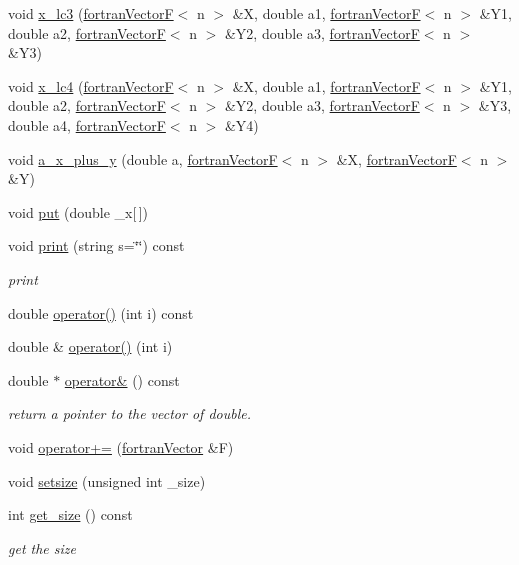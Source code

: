 \begin{DoxyCompactItemize}
\item 
void \hyperlink{classodes_1_1fortranVectorF_a643042c3db0e9be3a95a8f516d080fd4}{x\+\_\+lc3} (\hyperlink{classodes_1_1fortranVectorF}{fortran\+Vector\+F}$<$ n $>$ \&X, double a1, \hyperlink{classodes_1_1fortranVectorF}{fortran\+Vector\+F}$<$ n $>$ \&Y1, double a2, \hyperlink{classodes_1_1fortranVectorF}{fortran\+Vector\+F}$<$ n $>$ \&Y2, double a3, \hyperlink{classodes_1_1fortranVectorF}{fortran\+Vector\+F}$<$ n $>$ \&Y3)
\item 
void \hyperlink{classodes_1_1fortranVectorF_acb167044e5f56a0f7f98b6fe6746be62}{x\+\_\+lc4} (\hyperlink{classodes_1_1fortranVectorF}{fortran\+Vector\+F}$<$ n $>$ \&X, double a1, \hyperlink{classodes_1_1fortranVectorF}{fortran\+Vector\+F}$<$ n $>$ \&Y1, double a2, \hyperlink{classodes_1_1fortranVectorF}{fortran\+Vector\+F}$<$ n $>$ \&Y2, double a3, \hyperlink{classodes_1_1fortranVectorF}{fortran\+Vector\+F}$<$ n $>$ \&Y3, double a4, \hyperlink{classodes_1_1fortranVectorF}{fortran\+Vector\+F}$<$ n $>$ \&Y4)
\item 
void \hyperlink{classodes_1_1fortranVectorF_a21b1998c692b54b7dc08ad20bf34ffcd}{a\+\_\+x\+\_\+plus\+\_\+y} (double a, \hyperlink{classodes_1_1fortranVectorF}{fortran\+Vector\+F}$<$ n $>$ \&X, \hyperlink{classodes_1_1fortranVectorF}{fortran\+Vector\+F}$<$ n $>$ \&Y)
\item 
void \hyperlink{classodes_1_1fortranVectorF_aa2df927f58d5d1109a16e677ac288b66}{put} (double \+\_\+x\mbox{[}$\,$\mbox{]})
\item 
void \hyperlink{classodes_1_1fortranVectorF_aac928c0ef38e1b6226b621ff60ff092d}{print} (string s=\char`\"{}\char`\"{}) const 
\begin{DoxyCompactList}\small\item\em print \end{DoxyCompactList}\item 
double \hyperlink{classodes_1_1fortranVector_acd2f3c622c5c901e0a2fcefc445fb74c}{operator()} (int i) const 
\item 
double \& \hyperlink{classodes_1_1fortranVector_a9177196a3ec94139a163e7fa8b19b92b}{operator()} (int i)
\item 
double $\ast$ \hyperlink{classodes_1_1fortranVector_ada6f1dfa695ada960f621d9728e0f8e0}{operator\&} () const 
\begin{DoxyCompactList}\small\item\em return a pointer to the vector of double. \end{DoxyCompactList}\item 
void \hyperlink{classodes_1_1fortranVector_ae522acf0f26411ce0ee14c77cddd7bfa}{operator+=} (\hyperlink{classodes_1_1fortranVector}{fortran\+Vector} \&F)
\item 
void \hyperlink{classodes_1_1fortranVector_a7f11009e278203c327c93d68e86117c9}{setsize} (unsigned int \+\_\+size)
\item 
int \hyperlink{classodes_1_1fortranVector_a0a9a82f6efc0a9e5ea40dc240eebc800}{get\+\_\+size} () const 
\begin{DoxyCompactList}\small\item\em get the size \end{DoxyCompactList}\end{DoxyCompactItemize}
